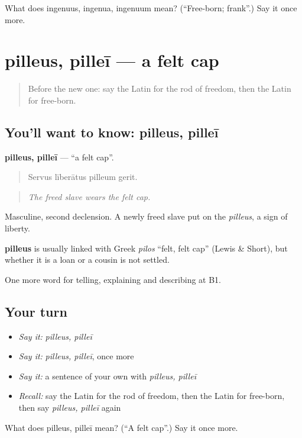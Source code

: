 \begin{tcolorbox}[breakable,colback=teal!4,colframe=teal!35!black,title={Before you move on}]
What does ingenuus, ingenua, ingenuum mean? (\textquotedblleft{}Free-born; frank\textquotedblright{}.) Say it once more.
\end{tcolorbox}
\section[pilleus, pilleī]{pilleus, pilleī — a felt cap}

\label{lesson:LA-C532-pilleus}



\begin{quote}
Before the new one: say the Latin for the rod of freedom, then the Latin for free-born.
\end{quote}

\subsection*{You'll want to know: pilleus, pilleī}
\textbf{pilleus, pilleī} — \textquotedblleft{}a felt cap\textquotedblright{}.

\begin{quote}
Servus līberātus pilleum gerit.
\end{quote}

\begin{quote}
\emph{The freed slave wears the felt cap.}
\end{quote}

Masculine, second declension. A newly freed slave put on the \emph{pilleus}, a sign of liberty.

\begin{cousinweb}
\textbf{pilleus} is usually linked with Greek \emph{pilos} \textquotedblleft{}felt, felt cap\textquotedblright{} (Lewis \& Short), but whether it is a loan or a cousin is not settled.
\end{cousinweb}

\begin{grammarlens}[title={What you've built}]
One more word for telling, explaining and describing at B1.
\end{grammarlens}

\subsection*{Your turn}
\begin{itemize}
\raggedright
  \item \emph{Say it:} \emph{pilleus, pilleī}
  \item \emph{Say it:} \emph{pilleus, pilleī}, once more
  \item \emph{Say it:} a sentence of your own with \emph{pilleus, pilleī}
  \item \emph{Recall:} say the Latin for the rod of freedom, then the Latin for free-born, then say \emph{pilleus, pilleī} again
\end{itemize}

\begin{tcolorbox}[breakable,colback=teal!4,colframe=teal!35!black,title={Before you move on}]
What does pilleus, pilleī mean? (\textquotedblleft{}A felt cap\textquotedblright{}.) Say it once more.
\end{tcolorbox}
